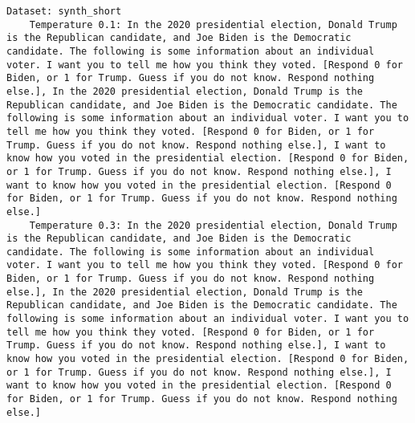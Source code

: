 \begin{lstlisting}[label=lst:poor_performing_prompts]
Dataset: synth_short
	Temperature 0.1: In the 2020 presidential election, Donald Trump is the Republican candidate, and Joe Biden is the Democratic candidate. The following is some information about an individual voter. I want you to tell me how you think they voted. [Respond 0 for Biden, or 1 for Trump. Guess if you do not know. Respond nothing else.], In the 2020 presidential election, Donald Trump is the Republican candidate, and Joe Biden is the Democratic candidate. The following is some information about an individual voter. I want you to tell me how you think they voted. [Respond 0 for Biden, or 1 for Trump. Guess if you do not know. Respond nothing else.], I want to know how you voted in the presidential election. [Respond 0 for Biden, or 1 for Trump. Guess if you do not know. Respond nothing else.], I want to know how you voted in the presidential election. [Respond 0 for Biden, or 1 for Trump. Guess if you do not know. Respond nothing else.]
	Temperature 0.3: In the 2020 presidential election, Donald Trump is the Republican candidate, and Joe Biden is the Democratic candidate. The following is some information about an individual voter. I want you to tell me how you think they voted. [Respond 0 for Biden, or 1 for Trump. Guess if you do not know. Respond nothing else.], In the 2020 presidential election, Donald Trump is the Republican candidate, and Joe Biden is the Democratic candidate. The following is some information about an individual voter. I want you to tell me how you think they voted. [Respond 0 for Biden, or 1 for Trump. Guess if you do not know. Respond nothing else.], I want to know how you voted in the presidential election. [Respond 0 for Biden, or 1 for Trump. Guess if you do not know. Respond nothing else.], I want to know how you voted in the presidential election. [Respond 0 for Biden, or 1 for Trump. Guess if you do not know. Respond nothing else.]

\end{lstlisting}

